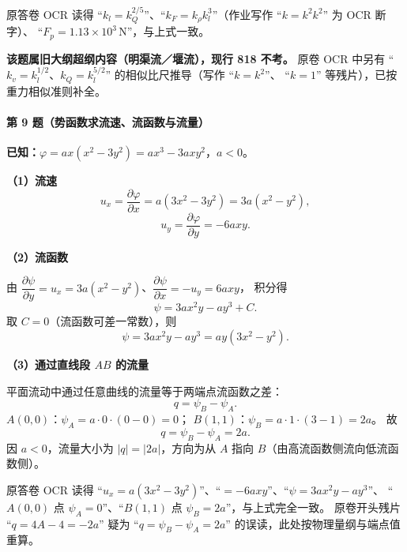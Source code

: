 \begin{tishi}
原答卷 OCR 读得 ``$k_l=k_Q^{2/5}$''、``$k_F=k_\rho k_l^{3}$''（作业写作 ``$k=k^2k^2$'' 为 OCR 断字）、
``$F_p=1.13\times10^{3}\,\mathrm{N}$''，与上式一致。

\textbf{该题属旧大纲超纲内容（明渠流／堰流），现行 818 不考。}
原卷 OCR 中另有 ``$k_v=k_l^{1/2}$、$k_Q=k_l^{5/2}$'' 的相似比尺推导（写作 ``$k=k^{2}$''、
``$k=1$'' 等残片），已按重力相似准则补全。
\end{tishi}

\paragraph{第 9 题（势函数求流速、流函数与流量）}
\begin{jie}
\textbf{已知：}$\varphi=ax(x^{2}-3y^{2})=ax^{3}-3axy^{2}$，$a<0$。

\textbf{（1）流速}
\[
u_x=\frac{\partial\varphi}{\partial x}=a(3x^{2}-3y^{2})=3a(x^{2}-y^{2}),
\]
\[
u_y=\frac{\partial\varphi}{\partial y}=-6axy .
\]

\textbf{（2）流函数}

由 $\dfrac{\partial\psi}{\partial y}=u_x=3a(x^{2}-y^{2})$、$\dfrac{\partial\psi}{\partial x}=-u_y=6axy$，
积分得
\[
\psi=3ax^{2}y-ay^{3}+C .
\]
取 $C=0$（流函数可差一常数），则
\[
\psi=3ax^{2}y-ay^{3}=ay(3x^{2}-y^{2}).
\]

\textbf{（3）通过直线段 $AB$ 的流量}

平面流动中通过任意曲线的流量等于两端点流函数之差：
\[
q=\psi_B-\psi_A .
\]
$A(0,0)$：$\psi_A=a\cdot0\cdot(0-0)=0$；
$B(1,1)$：$\psi_B=a\cdot1\cdot(3-1)=2a$。
故
\[
q=\psi_B-\psi_A=2a .
\]
因 $a<0$，流量大小为 $|q|=|2a|$，方向为从 $A$ 指向 $B$（由高流函数侧流向低流函数侧）。
\end{jie}

\begin{tishi}
原答卷 OCR 读得 ``$u_x=a(3x^{2}-3y^{2})$''、``$=-6axy$''、``$\psi=3ax^{2}y-ay^{3}$''、
``$A(0,0)$ 点 $\psi_A=0$''、``$B(1,1)$ 点 $\psi_B=2a$''，与上式完全一致。
原卷开头残片 ``$q=4A-4=-2a$'' 疑为 ``$q=\psi_B-\psi_A=2a$'' 的误读，此处按物理量纲与端点值重算。
\end{tishi}

